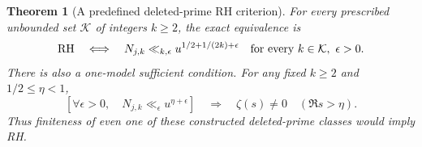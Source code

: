 \documentclass[11pt]{article}
\newtheorem{theorem}{Theorem}[section]
\theoremstyle{definition}
\begin{document}
\begin{theorem}[A predefined deleted-prime RH criterion]
For every prescribed unbounded set $\mathcal K$ of integers
$k\ge2$, the exact equivalence is
\begin{equation}
 {\rm RH}\quad\Longleftrightarrow\quad
 N_{j,k}\ll_{k,\epsilon}u^{1/2+1/(2k)+\epsilon}
       \quad\text{for every }k\in\mathcal K,\ \epsilon>0.
 \label{eq:deleted-prime-RH-count-equivalence}
\end{equation}
There is also a one-model sufficient condition.
For any fixed $k\ge2$ and $1/2\le\eta<1$,
\begin{equation}
 \left[
   \forall\epsilon>0,\quad N_{j,k}\ll_\epsilon u^{\eta+\epsilon}
 \right]
 \quad\Longrightarrow\quad
       \zeta(s)\ne0\quad(\Re s>\eta).
 \label{eq:deleted-prime-fixed-k-zero-free}
\end{equation}
Thus finiteness of even one of these constructed deleted-prime
classes would imply RH.
\end{theorem}
\end{document}
